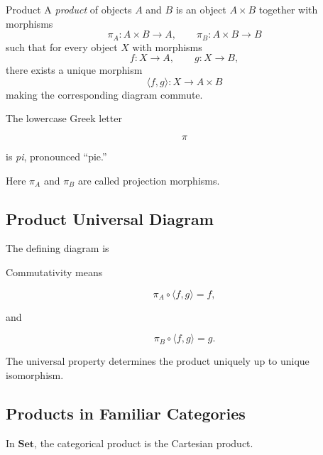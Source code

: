 \begin{definitionbox}{Product}
A \emph{product} of objects \(A\) and \(B\) is an object \(A\times B\)
together with morphisms
\[ \pi_A:A\times B\to A,\qquad
\pi_B:A\times B\to B \]
such that for every object \(X\) with morphisms
\[ f:X\to A,\qquad g:X\to B, \]
there exists a unique morphism
\[ \langle f,g\rangle:X\to A\times B \]
making the corresponding diagram commute.
\end{definitionbox}

The lowercase Greek letter

\[ \pi \]

is \emph{pi}, pronounced ``pie.''

Here \(\pi_A\) and \(\pi_B\) are called projection morphisms.

\subsection{Product Universal Diagram}
\label{subsec:product-universal-diagram}

The defining diagram is

\begin{centereddiagram}
\end{centereddiagram}

Commutativity means

\[ \pi_A\circ\langle f,g\rangle=f, \]

and

\[ \pi_B\circ\langle f,g\rangle=g. \]

The universal property determines the product uniquely up to unique
isomorphism.

\subsection{Products in Familiar Categories}
\label{subsec:products-familiar-categories}

In \(\mathbf{Set}\), the categorical product is the Cartesian product.

